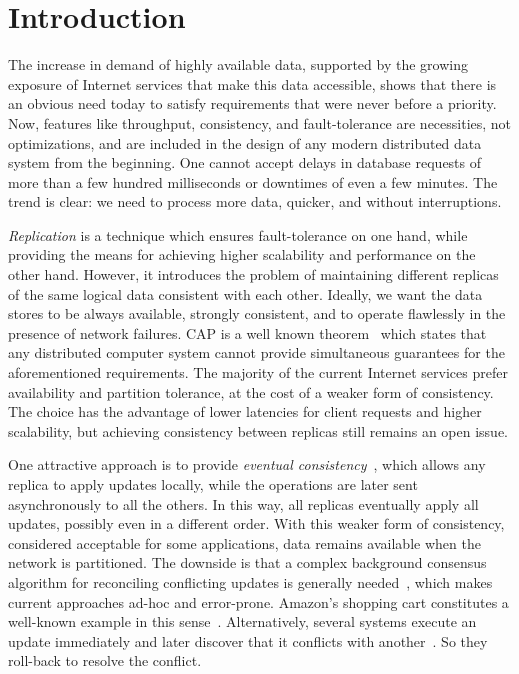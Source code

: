 \section{Introduction}
\label{sec:introduction}

The increase in demand of highly available data, supported by the growing
exposure of Internet services that make this data accessible, shows that there
is an obvious need today to satisfy requirements that were never before a priority.
Now, features like throughput, consistency, and fault-tolerance are necessities,
not optimizations, and are included in the design of any modern distributed data
system from the beginning. One cannot accept delays in database requests of more
than a few hundred milliseconds or downtimes of even a few minutes. The trend is
clear: we need to process more data, quicker, and without interruptions.

\textit{Replication} is a technique which ensures fault-tolerance on one hand,
while providing the means for achieving higher scalability and performance on the
other hand. However, it introduces the problem of maintaining different replicas
of the same logical data consistent with each other. Ideally, we want the data
stores to be always available, strongly consistent, and to operate flawlessly in
the presence of network failures. CAP is a well known
theorem~\cite{Gilbert:2002:BCF:564585.564601} which states that any distributed
computer system cannot provide simultaneous guarantees for the aforementioned
requirements. The majority of the current Internet services prefer availability
and partition tolerance, at the cost of a weaker form of consistency. The choice
has the advantage of lower latencies for client requests and higher scalability,
but achieving consistency between replicas still remains an open issue.

One attractive approach is to provide \textit{eventual
consistency}~\cite{DBLP:journals/queue/Vogels08a,Saito:2005:OR:1057977.1057980},
which allows any replica to apply updates locally, while the operations are
later sent asynchronously to all the others. In this way, all replicas
eventually apply all updates, possibly even in a different order. With this
weaker form of consistency, considered acceptable for some applications, data
remains available when the network is partitioned. The downside is that a
complex background consensus algorithm for reconciling conflicting updates is
generally needed~\cite{Terry:1995:MUC:224056.224070}, which makes current
approaches ad-hoc and error-prone. Amazon's shopping cart constitutes a
well-known example in this sense~\cite{DeCandia:2007:DAH:1294261.1294281}.
Alternatively, several systems execute an update immediately and later discover
that it conflicts with another~\cite{Terry:1995:MUC:224056.224070}. So they
roll-back to resolve the conflict.


